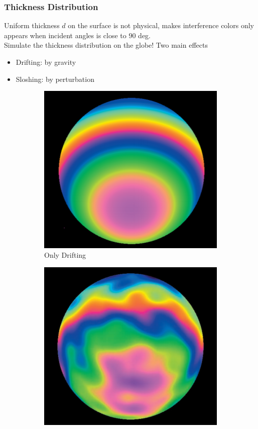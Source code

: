 \documentclass{beamer}
\begin{document}
\begin{frame}
	\frametitle{Thickness Distribution}
	Uniform thickness $d$ on the surface is not physical, makes interference colors only appears when incident angles is close to $90$ deg.\\
	Simulate the thickness distribution on the globe! Two main effects
	\begin{itemize}
		\item Drifting: by gravity
		\item Sloshing: by perturbation
	\end{itemize}
	\begin{figure}
    \centering
	\begin{subfigure}[b]{0.2\textwidth}
		\includegraphics[width=\textwidth]{thickness_drifting.png}
		\caption{\footnotesize Only Drifting}
	\end{subfigure}
	\quad\quad
	\begin{subfigure}[b]{0.2\textwidth}
		\includegraphics[width=\textwidth]{thickness_sloshing.png}

\end{subfigure}
\end{figure}
\end{frame}
\end{document}
